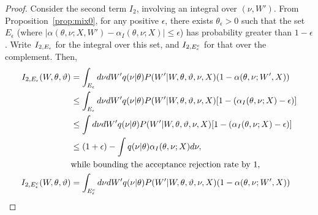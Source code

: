 \begin{proof}
{Consider the second term $I_2$, involving an integral over $(\nu,W')$.
  From Proposition~\ref{prop:mix0}, for any positive $\epsilon$, there
  exists $\theta_\epsilon > 0$ such that the set $E_{\epsilon}$
  (where $|\alpha(\theta, \nu ; X,W') - \alpha_I(\theta, \nu ; X)| \le
  \epsilon$) has probability greater than $1-\epsilon$.
  Write $I_{2,E_{\epsilon}}$ for the integral over this set, and
  $I_{2,E_{\epsilon}^c}$ for that over the complement. Then,
}
\begin{align*}
I_{2,\E_{\epsilon}}(W, \theta, \vartheta) &= \int_{\E_{\epsilon}} d\nu  dW'q(\nu | \theta)P(W' | W, \theta, \vartheta, \nu, X)(1 - \alpha(\theta, \nu ; W', X)) \\
&\le \int_{\E_\epsilon}d\nu dW' q(\nu | \theta)
  P(W' | W, \theta, \vartheta, \nu, X)  [ 1 - (\alpha_I(\theta, \nu ; X)-\epsilon)] \\
&\le   \int d\nu dW'  q(\nu | \theta)
  P(W' | W, \theta, \vartheta, \nu, X)
  [ 1 - (\alpha_I(\theta, \nu ; X)-\epsilon)] \\
  &\le (1+\epsilon)  - \int  q(\nu | \theta) \alpha_I(\theta, \nu ; X) d\nu, \\
 & \text{while bounding the acceptance rejection rate by 1,} \\
  I_{2,\E_{\epsilon}^c}(W, \theta, \vartheta)  &= \int_{\E^c_{\epsilon}} d\nu  dW'q(\nu | \theta)P(W' | W, \theta, \vartheta, \nu, X)(1 - \alpha(\theta, \nu ; W', X)) \\

\end{align*}
\end{proof}
